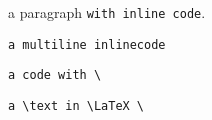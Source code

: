 a paragraph \texttt{with inline code}.

\texttt{a
multiline
inlinecode}

\texttt{a code with \textbackslash}

\texttt{a \textbackslash{}text in \textbackslash{}LaTeX \textbackslash{}}
